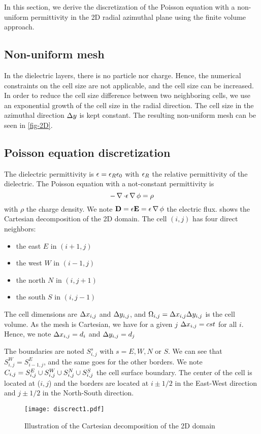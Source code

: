   In this section, we derive the discretization of the Poisson equation with a non-uniform permittivity in the \ac{2D} radial azimuthal plane using the finite volume approach.


  \subsection{Non-uniform mesh}

    In the dielectric layers, there is no particle nor charge.
    Hence, the numerical constraints on the cell size are not applicable, and the cell size can be increased.
    In order to reduce the cell size difference between two neighboring cells, we use an exponential growth of the cell size in the radial direction.
    The cell size in the azimuthal direction $\Delta y$ is kept constant.
    The resulting non-uniform mesh can be seen in \cref{fig-2D}.


  \subsection{Poisson equation discretization}


  The dielectric permittivity is $\epsilon= \epsilon_{R} \epsilon_0$ with $\epsilon_{R}$ the relative permittivity of the dielectric.
  The Poisson equation with a not-constant permittivity is
  \begin{equation} \label{eq-poissondiel}
    - \operatorname{{\mathbf \nabla}} \cdot \epsilon \operatorname{{\mathbf \nabla}} \phi = \rho
  \end{equation}
  with $\rho$ the charge density.
  We note ${\mathbf D}=\epsilon {\mathbf E} = \epsilon \operatorname{{\mathbf \nabla}} \phi$ the electric flux.
   shows the Cartesian decomposition of the \ac{2D} domain.
  The cell $(i,j)$ has four direct neighbors\string:
  \begin{itemize}
    \item the east $E$ in $(i+1,j)$
    \item the west $W$ in $(i-1, j)$
    \item the north $N$ in $(i, j+1)$
    \item the south $S$ in $(i, j-1)$
  \end{itemize}
  The cell dimensions are $\Delta x_{i,j}$ and $\Delta y_{i,j}$, and $\Omega_{i,j}=\Delta x_{i,j} \Delta y_{i,j}$ is the cell volume.
  As the mesh is Cartesian, we have for a given $j$ $\Delta x_{i,j} = cst$ for all $i$. Hence, we note $\Delta x_{i,j} = d_i$ and $\Delta y_{i,j} = d_j$

  The boundaries are noted $S^s_{i,j}$ with $s=E,W,N$ or $S$.
  We can see that $S^W_{i,j}=S^E_{i-1,j}$, and the same goes for the other borders.
  We note $C_{i,j} = S^E_{i,j} \cup S^W_{i,j} \cup S^N_{i,j} \cup S^S_{i,j}$ the cell surface boundary.
  The center of the cell is located at ($i,j$) and the borders are located at $i\pm 1/2$ in the East-West direction and $j\pm 1/2$ in the North-South direction.
  \begin{figure}[hbt]
    \centering
    \texttt{[image: discrect1.pdf]}
    \caption{Illustration of the Cartesian decomposition of the \acs{2D} domain}
    \label{fig-decompo1}
  \end{figure}


